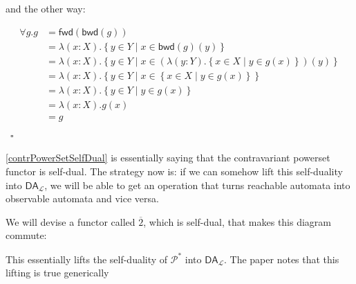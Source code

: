 \documentclass{article}
\theoremstyle{plain}
\theoremstyle{definition}
\begin{document}
and the other way:

\[
\begin{aligned}
\forall g . g & = \mathsf{fwd}\left( \mathsf{bwd}\left( g \right) \right) \\ & = \lambda \left( x : X \right) . \left\{ y \in Y \mid x \in \mathsf{bwd}\left( g \right)\left( y \right) \right\} \\ & = \lambda \left( x : X \right) . \left\{ y \in Y \mid x \in \left( \lambda \left( y : Y \right) . \left\{ x \in X \mid y \in g\left( x \right) \right\} \right)\left( y \right) \right\} \\ & = \lambda \left( x : X \right) . \left\{ y \in Y \mid x \in \left\{ x \in X \mid y \in g\left( x \right) \right\} \right\} \\ & = \lambda \left( x : X \right) . \left\{ y \in Y \mid y \in g\left( x \right) \right\} \\ & = \lambda \left( x : X \right) . g\left( x \right) \\ & = g \\
\end{aligned}
\]  ~\ensuremath{\square}

\ref{contrPowerSetSelfDual} is essentially saying that the contravariant powerset functor is self-dual. The strategy now is: if we can somehow lift this self-duality into \ensuremath{{\mathsf{DA}}_{\mathcal{L}}}, we will be able to get an operation that turns reachable automata into observable automata and vice versa.



We will devise a functor called \ensuremath{\overline{2}}, which is self-dual, that makes this diagram commute:


\begin{center}
\end{center}


This essentially lifts the self-duality of \ensuremath{{\mathcal{P}}^{\ast }} into \ensuremath{{\mathsf{DA}}_{\mathcal{L}}}. The paper \cite{bonchiAlgebracoalgebraDualityBrzozowskis2014} notes that this lifting is true generically
\end{document}
